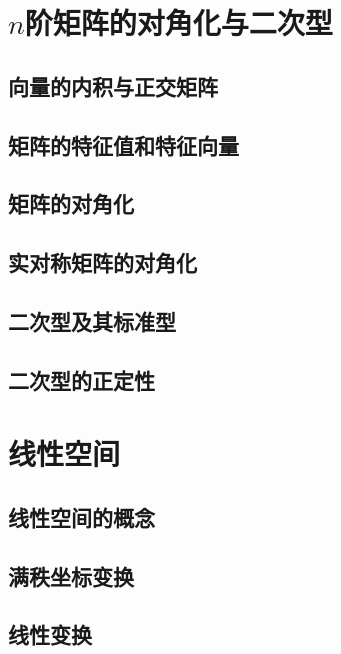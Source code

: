 \documentclass[lang=cn,10pt]{elegantbook}
\begin{document}
\chapter{\( n \)阶矩阵的对角化与二次型}

	\section{向量的内积与正交矩阵}
	
	\section{矩阵的特征值和特征向量}
	
	\section{矩阵的对角化}
	
	\section{实对称矩阵的对角化}
	
	\section{二次型及其标准型}
	
	\section{二次型的正定性}

\chapter{线性空间}

	\section{线性空间的概念}
	
	\section{满秩坐标变换}
	
	\section{线性变换}
\end{document}
